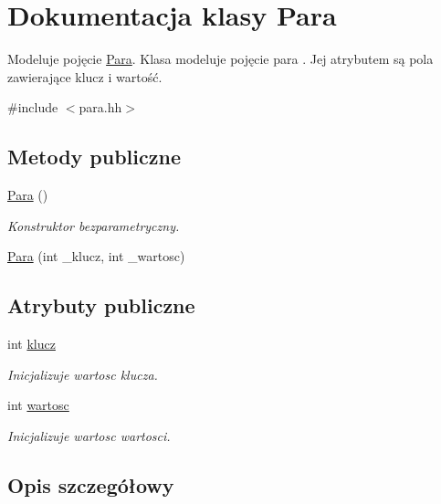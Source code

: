 \hypertarget{class_para}{\section{Dokumentacja klasy Para}
\label{class_para}
}


Modeluje pojęcie \hyperlink{class_para}{Para}. Klasa modeluje pojęcie para . Jej atrybutem są pola zawierające klucz i wartość.  




{\ttfamily \#include $<$para.\-hh$>$}

\subsection*{Metody publiczne}
\begin{DoxyCompactItemize}
\item 
\hyperlink{class_para_a391b57d370246309feb169f708b33b8f}{Para} ()
\begin{DoxyCompactList}\small\item\em Konstruktor bezparametryczny. \end{DoxyCompactList}\item 
\hyperlink{class_para_aa167d3206ddb657c90a11144c52354d8}{Para} (int \-\_\-klucz, int \-\_\-wartosc)
\end{DoxyCompactItemize}
\subsection*{Atrybuty publiczne}
\begin{DoxyCompactItemize}
\item 
int \hyperlink{class_para_a4defe3990664c62fba0c75f3b2fc0f61}{klucz}
\begin{DoxyCompactList}\small\item\em Inicjalizuje wartosc klucza. \end{DoxyCompactList}\item 
int \hyperlink{class_para_a0c99183281c295298b3fb99f8795a591}{wartosc}
\begin{DoxyCompactList}\small\item\em Inicjalizuje wartosc wartosci. \end{DoxyCompactList}\end{DoxyCompactItemize}


\subsection{Opis szczegółowy}


